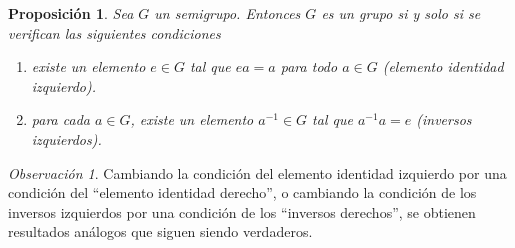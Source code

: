 \documentclass{report}
\newtheorem{proposition}{Proposición}
\theoremstyle{remark}
\newtheorem{remark}{Observación}
\begin{document}
  \begin{proposition}
    Sea \(G\) un  semigrupo.
    Entonces \(G\) es un grupo si y solo si se verifican las siguientes condiciones
    \begin{enumerate}
      \item \label{condition:leftIdentityElement} existe un elemento \(e \in G\) tal que \(e a = a\) para todo \( a \in G\) (elemento identidad izquierdo).
      \item \label{condition:leftInverse} para cada \(a \in G\), existe un elemento \(a^{- 1} \in G\) tal que \(a^{- 1} a = e\) (inversos izquierdos).
    \end{enumerate}
  \end{proposition}

  \begin{remark}
    Cambiando la condición del elemento identidad izquierdo por una condición del ``elemento identidad derecho'', o cambiando la condición de los inversos izquierdos por una condición de los ``inversos derechos'', se obtienen resultados análogos que siguen siendo verdaderos.
  \end{remark}
\end{document}
